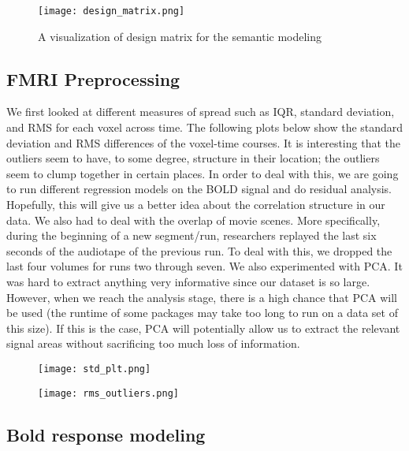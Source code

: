 \begin{figure}[!htbp]
\centering
\texttt{[image: design\_matrix.png]}
\caption{\label{fig:design_matrix} A visualization of design matrix for the semantic modeling}
\end{figure}

\subsection{FMRI Preprocessing}
\par We first looked at different measures of spread such as IQR, standard deviation, and RMS for each voxel across time. The following plots below show the standard deviation and RMS differences of the voxel-time courses. It is interesting that the outliers seem to have, to some degree, structure in their location; the outliers seem to clump together in certain places. In order to deal with this, we are going to run different regression models on the BOLD signal and do residual analysis. Hopefully, this will give us a better idea about the correlation structure in our data. We also had to deal with the overlap of movie scenes. More specifically, during the beginning of a new segment/run, researchers replayed the last six seconds of the audiotape of the previous run. To deal with this, we dropped the last four volumes for runs two through seven. We also experimented with PCA. It was hard to extract anything very informative since our dataset is so large. However, when we reach the analysis stage, there is a high chance that PCA will be used (the runtime of some packages may take too long to run on a data set of this size). If this is the case, PCA will potentially allow us to extract the relevant signal areas without sacrificing too much loss of information. 

\begin{figure}
\centering
\begin{minipage}{.5\textwidth}
  \centering
  \texttt{[image: std\_plt.png]}
  \label{fig:test1}
\end{minipage}%
\begin{minipage}{.5\textwidth}
  \centering
  \texttt{[image: rms\_outliers.png]}
  \label{fig:test2}
\end{minipage}
\end{figure}
\clearpage

\subsection{Bold response modeling}
